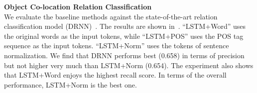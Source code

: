 %
%
\textbf{Object Co-location Relation Classification}\\
We evaluate the baseline methods against the state-of-the-art relation 
classification model (DRNN)~\cite{Xu2016ImprovedRC}. 
The results are shown in~.
``LSTM+Word'' uses the original words as the input tokens, while ``LSTM+POS'' uses the POS tag sequence as the input tokens. ``LSTM+Norm'' uses the tokens of 
sentence normalization. 
%
We find that DRNN performs best (0.658) in terms of precision but not higher very much than  LSTM+Norm (0.654). 
The experiment also shows that LSTM+Word enjoys the highest recall score.
In terms of the overall performance, LSTM+Norm is the best one. 
%

